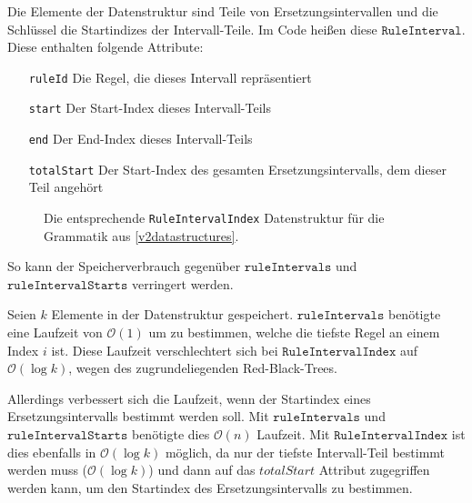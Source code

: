 Die Elemente der Datenstruktur sind Teile von Ersetzungsintervallen und die Schlüssel die Startindizes der Intervall-Teile. Im Code heißen diese $\texttt{RuleInterval}$. Diese enthalten folgende Attribute:
\begin{itemize}[leftmargin=2.5cm]
	\item[\texttt{ruleId}] Die Regel, die dieses Intervall repräsentiert
	\item[\texttt{start}] Der Start-Index dieses Intervall-Teils
	\item[\texttt{end}] Der End-Index dieses Intervall-Teils
	\item[\texttt{totalStart}] Der Start-Index des gesamten Ersetzungsintervalls, dem dieser Teil angehört
\end{itemize}

\begin{figure}
	\centering
	
    \caption{Die entsprechende \texttt{RuleIntervalIndex} Datenstruktur für die Grammatik aus \autoref{v2datastructures}.}
    \label{v3ruleintervalindex}
\end{figure}

So kann der Speicherverbrauch gegenüber $\texttt{ruleIntervals}$ und $\texttt{ruleIntervalStarts}$ verringert werden. 

Seien $k$ Elemente in der Datenstruktur gespeichert.
$\texttt{ruleIntervals}$ benötigte eine Laufzeit von $\mathcal{O}(1)$ um zu bestimmen, welche die tiefste Regel an einem Index $i$ ist. Diese Laufzeit verschlechtert sich bei $\texttt{RuleIntervalIndex}$ auf $\mathcal{O}(\log k)$, wegen des zugrundeliegenden Red-Black-Trees.

Allerdings verbessert sich die Laufzeit, wenn der Startindex eines Ersetzungsintervalls bestimmt werden soll. Mit $\texttt{ruleIntervals}$ und $\texttt{ruleIntervalStarts}$ benötigte dies $\mathcal{O}(n)$ Laufzeit. Mit $\texttt{RuleIntervalIndex}$ ist dies ebenfalls in $\mathcal{O}(\log k)$ möglich, da nur der tiefste Intervall-Teil bestimmt werden muss ($\mathcal{O}(\log k)$) und dann auf das $totalStart$ Attribut zugegriffen werden kann, um den Startindex des Ersetzungsintervalls zu bestimmen.

